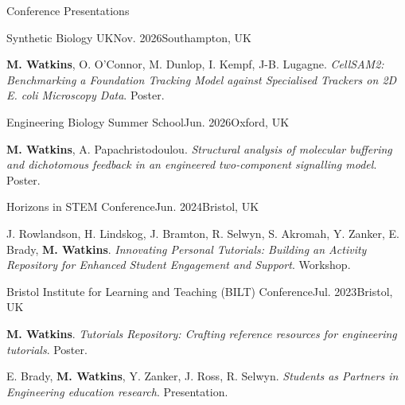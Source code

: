 
\begin{rSection}{Conference Presentations}

    \begin{rSubsection}{Synthetic Biology UK}{Nov. 2026}{Southampton, UK}{}
        \item \textbf{M. Watkins}, O. O'Connor, M. Dunlop, I. Kempf, J-B. Lugagne. \textit{CellSAM2: Benchmarking a Foundation Tracking Model against Specialised Trackers on 2D \textup{E. coli} Microscopy Data}. Poster.
    \end{rSubsection}

    \begin{rSubsection}{Engineering Biology Summer School}{Jun. 2026}{Oxford, UK}{}
        \item \textbf{M. Watkins}, A. Papachristodoulou. \textit{Structural analysis of molecular buffering and dichotomous feedback in an engineered two-component signalling model}. Poster.
    \end{rSubsection}

    \begin{rSubsection}{Horizons in STEM Conference}{Jun. 2024}{Bristol, UK}{}
        \item J. Rowlandson, H. Lindskog, J. Bramton, R. Selwyn, S. Akromah, Y. Zanker, E. Brady, \textbf{M. Watkins}. \textit{Innovating Personal Tutorials: Building an Activity Repository for Enhanced Student Engagement and Support}. Workshop.
    \end{rSubsection}

    \begin{rSubsection}{Bristol Institute for Learning and Teaching (BILT) Conference}{Jul. 2023}{Bristol, UK}{}
        \item \textbf{M. Watkins}. \textit{Tutorials Repository: Crafting reference resources for engineering tutorials}. Poster.
        \item E. Brady, \textbf{M. Watkins}, Y. Zanker, J. Ross, R. Selwyn. \textit{Students as Partners in Engineering education research}. Presentation.
    \end{rSubsection}

\end{rSection}
